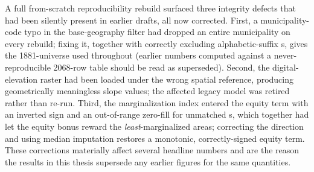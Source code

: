A full from-scratch reproducibility rebuild surfaced three integrity defects that had
been silently present in earlier drafts, all now corrected. First, a municipality-code
typo in the base-geography filter had dropped an entire municipality on every rebuild;
fixing it, together with correctly excluding alphabetic-suffix \ageb{}s, gives the
\num{1881}-\ageb universe used throughout (earlier numbers computed against a
never-reproducible \num{2068}-row table should be read as superseded). Second, the
digital-elevation raster had been loaded under the wrong spatial reference, producing
geometrically meaningless slope values; the affected legacy model was retired rather
than re-run. Third, the marginalization index entered the equity term with an inverted
sign and an out-of-range zero-fill for unmatched \ageb{}s, which together had let the
equity bonus reward the \emph{least}-marginalized areas; correcting the direction and
using median imputation restores a monotonic, correctly-signed equity term. These
corrections materially affect several headline numbers and are the reason the results
in this thesis supersede any earlier figures for the same quantities.
